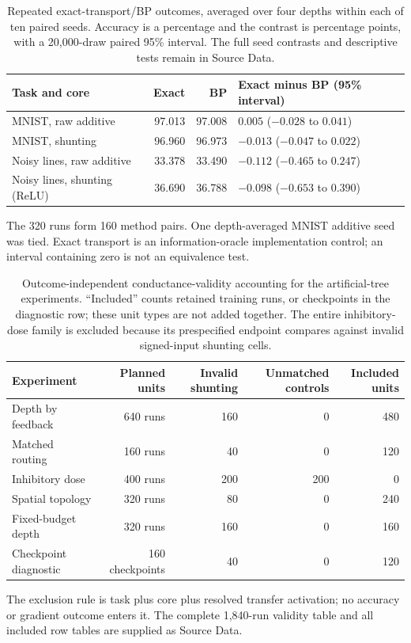 \begin{table}[tbp]
\centering
\caption{Repeated exact-transport/BP outcomes, averaged over four depths within each of ten paired seeds. Accuracy is a percentage and the contrast is percentage points, with a 20,000-draw paired 95\% interval. The full seed contrasts and descriptive tests remain in Source Data.}
\label{tab:clean_exact_bp}
\small
\begin{tabularx}{\textwidth}{p{}rrX}
\toprule
Task and core & Exact & BP & Exact minus BP (95\% interval) \\
\midrule
MNIST, raw additive & 97.013 & 97.008 & $0.005$ ($-0.028$ to $0.041$) \\
MNIST, shunting & 96.960 & 96.973 & $-0.013$ ($-0.047$ to $0.022$) \\
Noisy lines, raw additive & 33.378 & 33.490 & $-0.112$ ($-0.465$ to $0.247$) \\
Noisy lines, shunting (ReLU) & 36.690 & 36.788 & $-0.098$ ($-0.653$ to $0.390$) \\
\bottomrule
\end{tabularx}

The 320 runs form 160 method pairs. One depth-averaged MNIST additive seed was tied. Exact transport is an information-oracle implementation control; an interval containing zero is not an equivalence test.
\end{table}

\begin{table}[ht]
\centering
\caption{Outcome-independent conductance-validity accounting for the artificial-tree experiments. ``Included'' counts retained training runs, or checkpoints in the diagnostic row; these unit types are not added together. The entire inhibitory-dose family is excluded because its prespecified endpoint compares against invalid signed-input shunting cells.}
\label{tab:input_validity}
\small
\begin{tabular}{lrrrr}
\toprule
Experiment & Planned units & Invalid shunting & Unmatched controls & Included units \\
\midrule
Depth by feedback & 640 runs & 160 & 0 & 480 \\
Matched routing & 160 runs & 40 & 0 & 120 \\
Inhibitory dose & 400 runs & 200 & 200 & 0 \\
Spatial topology & 320 runs & 80 & 0 & 240 \\
Fixed-budget depth & 320 runs & 160 & 0 & 160 \\
Checkpoint diagnostic & 160 checkpoints & 40 & 0 & 120 \\
\bottomrule
\end{tabular}

\vspace{4pt}
\small The exclusion rule is task plus core plus resolved transfer
activation; no accuracy or gradient outcome enters it. The complete 1,840-run
validity table and all included row tables are supplied as Source Data.
\end{table}

